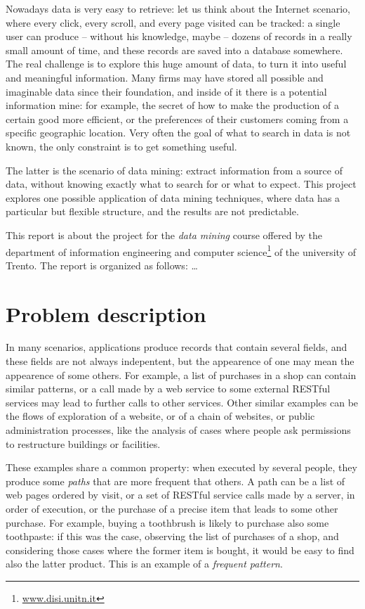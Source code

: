 \documentclass{acm_proc_article-sp-sigmod09}
\begin{document}
Nowadays data is very easy to retrieve: let us think about the Internet scenario, where every click, every scroll, and every page visited can be tracked: a single user can produce -- without his knowledge, maybe -- dozens of records in a really small amount of time, and these records are saved into a database somewhere. The real challenge is to explore this huge amount of data, to turn it into useful and meaningful information. Many firms may have stored all possible and imaginable data since their foundation, and inside of it there is a potential information mine: for example, the secret of how to make the production of a certain good more efficient, or the preferences of their customers coming from a specific geographic location. Very often the goal of what to search in data is not known, the only constraint is to get something useful.

The latter is the scenario of data mining: extract information from a source of data, without knowing exactly what to search for or what to expect. This project explores one possible application of data mining techniques, where data has a particular but flexible structure, and the results are not predictable.

This report is about the project for the \emph{data mining} course offered by the department of information engineering and computer science\footnote{\url{www.disi.unitn.it}} of the university of Trento. The report is organized as follows: \dots

\section{Problem description}
In many scenarios, applications produce records that contain several fields, and these fields are not always indepentent, but the appearence of one may mean the appearence of some others. For example, a list of purchases in a shop can contain similar patterns, or a call made by a web service to some external RESTful services may lead to further calls to other services. Other similar examples can be the flows of exploration of a website, or of a chain of websites, or public administration processes, like the analysis of cases where people ask permissions to restructure buildings or facilities. 

These examples share a common property: when executed by several people, they produce some \emph{paths} that are more frequent that others. A path can be a list of web pages ordered by visit, or a set of RESTful service calls made by a server, in order of execution, or the purchase of a precise item that leads to some other purchase. For example, buying a toothbrush is likely to purchase also some toothpaste: if this was the case, observing the list of purchases of a shop, and considering those cases where the former item is bought, it would be easy to find also the latter product. This is an example of a \emph{frequent pattern}.
\end{document}
